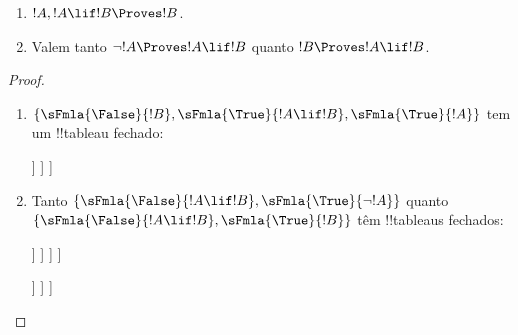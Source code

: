 \documentclass[../../../include/open-logic-section]{subfiles}
\begin{document}
\begin{prop}
  \begin{enumerate}
  \item {}  $!A, !A \lif !B \Proves !B$.
  \item {}
    Valem tanto $\lnot !A \Proves !A \lif !B$ quanto $!B \Proves !A \lif !B$.
  \end{enumerate}
\end{prop}

\begin{proof}
  \begin{enumerate}
    \item $\{\sFmla{\False}{!B}, \sFmla{\True}{!A \lif !B},
      \sFmla{\True}{!A}\}$ tem um !!{tableau} fechado:
      \begin{oltableau}
        [\sFmla{\False}{\formula{B}}, just=\TAss
          [\sFmla{\True}{\formula{A} \lif \formula{B}}, just=\TAss
            [\sFmla{\True}{\formula{A}}, just=\TAss
              [\sFmla{\False}{\formula{A}}, just = {\TRule{\True}{\lif}[2]}, close]
              [\sFmla{\True}{\formula{B}}, just = {\TRule{\True}{\lif}[2]}, close]
            ]
          ]
        ]
      \end{oltableau}
    \item Tanto $\{\sFmla{\False}{!A \lif !B},
      \sFmla{\True}{\lnot !A}\}$ quanto $\{\sFmla{\False}{!A \lif !B},
      \sFmla{\True}{!B}\}$ têm !!{tableau}s fechados:
      \begin{oltableau}
        [\sFmla{\False}{\formula{A} \lif \formula{B}}, just = \TAss
          [\sFmla{\True}{\lnot \formula{A}}, just = \TAss
            [\sFmla{\True}{\formula{A}}, just = {\TRule{\False}{\lif}[1]}
              [\sFmla{\False}{\formula{B}}, just = {\TRule{\False}{\lif}[1]}
                [\sFmla{\False}{\formula{A}}, just = {\TRule{\True}{\lnot}[2]}, close]
              ]
            ]
          ]
        ]
      \end{oltableau}
      \begin{oltableau}
        [\sFmla{\False}{\formula{A} \lif \formula{B}}, just = \TAss
          [\sFmla{\True}{\formula{B}}, just = \TAss
            [\sFmla{\True}{\formula{A}}, just = {\TRule{\False}{\lif}[1]}
              [\sFmla{\False}{\formula{B}}, just = {\TRule{\False}{\lif}[1]},close
              ]
            ]
          ]
        ]
      \end{oltableau}
  \end{enumerate}
\end{proof}
\end{document}
